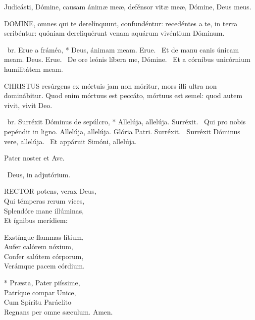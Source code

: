 


 Judicásti, Dómine, causam ánimæ meæ, defénsor vitæ meæ, Dómine, Deus meus.


\lettrine[lines=2]{D}{OMINE}, omnes qui te derelínquunt, confundéntur: recedéntes a te, in terra scribéntur: quóniam dereliquérunt venam aquárum vivéntium Dóminum.

\R\ br. Erue a fráméa, * Deus, ánimam meam. Erue. \V\ Et de manu canis únicam meam. Deus. Erue. \V\ De ore leónis líbera me, Dómine. \R\ Et a córnibus unicórnium humilitátem meam.




\lettrine[lines=2]{C}{HRISTUS} resúrgens ex mórtuis jam non móritur, mors illi ultra non dominábitur. Quod enim mórtuus est peccáto, mórtuus est semel: quod autem vivit, vivit Deo.

\R\ br. Surréxit Dóminus de sepúlcro, * Allelúja, allelúja. Surréxit. \V\ Qui pro nobis pepéndit in ligno. Allelúja, allelúja. Glória Patri. Surréxit. \V\ Surréxit Dóminus vere, allelúja. \R\ Et appáruit Simóni, allelúja.


\sectionornament


Pater noster et Ave.

\V\ Deus, in adjutórium.


\lettrine[lines=2]{R}{ECTOR} potens, verax Deus,\\
Qui témperas rerum vices,\\
Splendóre mane illúminas,\\
Et ígnibus merídiem:

Exstíngue flammas lítium,\\
Aufer calórem nóxium,\\
Confer salútem córporum,\\
Verámque pacem córdium.

* Præsta, Pater piíssime,\\
Patríque compar Unice,\\
Cum Spíritu Paráclito\\
Regnans per omne sæculum. Amen.

